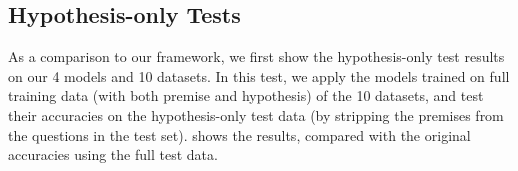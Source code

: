%
%
%
%

\subsection{Hypothesis-only Tests}
As a comparison to our framework, we first show the hypothesis-only test results
on our 4 models and 10 datasets. In this test, we apply the models trained on
full training data (with both premise and hypothesis) of the 10 datasets, and
test their accuracies on the hypothesis-only test data (by stripping
the premises from the questions in the test set). 
shows the results, compared with the original accuracies using the full
test data. 


